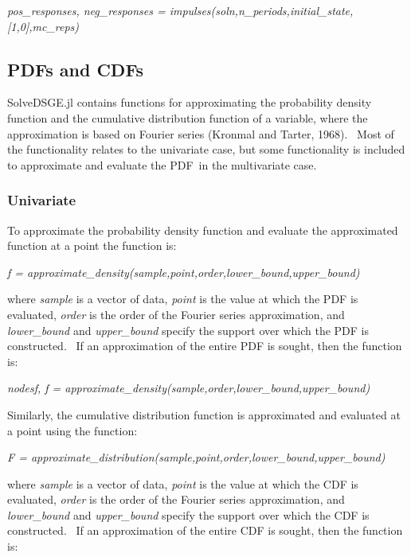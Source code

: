 \documentclass[notitlepage,11pt]{article}
\begin{document}
\bigskip 

\textit{pos\_responses, neg\_responses =
impulses(soln,n\_periods,initial\_state,[1,0],mc\_reps)}

\bigskip 

\subsection{PDFs and CDFs}

SolveDSGE.jl contains functions for approximating the probability density
function and the cumulative distribution function of a variable, where the
approximation is based on Fourier series (Kronmal and Tarter, 1968). \ Most
of the functionality relates to the univariate case, but some functionality
is included to approximate and evaluate the PDF\ in the multivariate case.

\subsubsection{Univariate}

To approximate the probability density function and evaluate the
approximated function at a point the function is:

\bigskip

\textit{f =
approximate\_density(sample,point,order,lower\_bound,upper\_bound)}

\bigskip

where \textit{sample} is a vector of data, \textit{point} is the value at
which the PDF is evaluated, \textit{order} is the order of the Fourier
series approximation, and \textit{lower\_bound} and \textit{upper\_bound}
specify the support over which the PDF is constructed. \ If an approximation
of the entire PDF is sought, then the function is:

\bigskip

\textit{nodesf, f =
approximate\_density(sample,order,lower\_bound,upper\_bound)}

\bigskip

Similarly, the cumulative distribution function is approximated and
evaluated at a point using the function:

\bigskip

\textit{F =
approximate\_distribution(sample,point,order,lower\_bound,upper\_bound)}

\bigskip

where \textit{sample} is a vector of data, \textit{point} is the value at
which the CDF is evaluated, \textit{order} is the order of the Fourier
series approximation, and \textit{lower\_bound} and \textit{upper\_bound}
specify the support over which the CDF is constructed. \ If an approximation
of the entire CDF is sought, then the function is:
\end{document}
